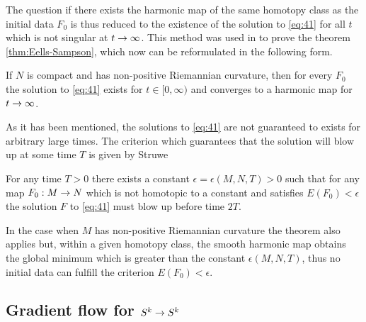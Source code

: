 The question if there exists the harmonic map of the same homotopy
class as the initial data $F_0$ is thus reduced to the existence of
the solution to \eqref{eq:41} for all $t$ which is not singular at
$t\rightarrow\infty$. This method was used in \cite{Eells1964} to prove the
theorem \ref{thm:Eells-Sampson}, which now can be reformulated in the
following form.

\begin{theorem}\label{thm:Eells-Sampson2}
  If $N$ is compact and has non-positive Riemannian curvature, then
  for every $F_0$ the solution to \eqref{eq:41} exists for
  $t\in[0,\infty)$ and converges to a harmonic map for $t\rightarrow\infty$.
\end{theorem}

As it has been mentioned, the solutions to \eqref{eq:41} are not
guaranteed to exists for arbitrary large times. The criterion which
guarantees that the solution will blow up at some time $T$ is given by
Struwe

\begin{theorem}[Struwe]\label{thm:Struwe}
  For any time $T>0$ there exists a constant
  $\epsilon=\epsilon(M,N,T)>0$ such that for any map $F_0:M\rightarrow N$
  which is not homotopic to a constant and satisfies $E(F_0)<\epsilon$
  the solution $F$ to \eqref{eq:41} must blow up before time $2T$.
\end{theorem}

In the case when $M$ has non-positive Riemannian curvature the theorem
also applies but, within a given homotopy class, the smooth harmonic
map obtains the global minimum which is greater than the constant
$\epsilon(M,N,T)$, thus no initial data can fulfill the criterion
$E(F_0)<\epsilon$.

\subsection{Gradient flow for $S^k\rightarrow S^k$}
\label{sec:gradient-flow-skra}

